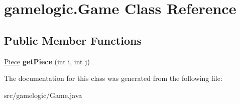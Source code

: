 \hypertarget{classgamelogic_1_1_game}{}\section{gamelogic.\+Game Class Reference}
\label{classgamelogic_1_1_game}
\subsection*{Public Member Functions}
\begin{DoxyCompactItemize}
\item 
\mbox{\label{classgamelogic_1_1_game_aeb453c7041c229536de42a1196b2297a}} 
\mbox{\hyperlink{classgamelogic_1_1_piece}{Piece}} {\bfseries get\+Piece} (int i, int j)
\end{DoxyCompactItemize}


The documentation for this class was generated from the following file\+:\begin{DoxyCompactItemize}
\item 
src/gamelogic/Game.\+java\end{DoxyCompactItemize}
